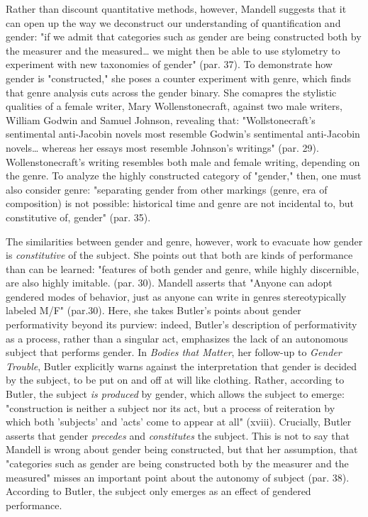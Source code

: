\documentclass[11pt]{article}
\begin{document}
Rather than discount quantitative methods, however, Mandell suggests
that it can open up the way we deconstruct our understanding of
quantification and gender: "if we admit that categories such as gender
are being constructed both by the measurer and the measured\ldots{} we
might then be able to use stylometry to experiment with new taxonomies
of gender" (par. 37). To demonstrate how gender is "constructed," she
poses a counter experiment with genre, which finds that genre analysis
cuts across the gender binary. She comapres the stylistic qualities of
a female writer, Mary Wollenstonecraft, against two male writers,
William Godwin and Samuel Johnson, revealing that: "Wollstonecraft’s
sentimental anti-Jacobin novels most resemble Godwin’s sentimental
anti-Jacobin novels\ldots{} whereas her essays most resemble Johnson’s
writings" (par. 29). Wollenstonecraft's writing resembles both male
and female writing, depending on the genre. To analyze the highly
constructed category of "gender," then, one must also consider genre:
"separating gender from other markings (genre, era of composition) is
not possible: historical time and genre are not incidental to, but
constitutive of, gender" (par. 35).

The similarities between gender and genre, however, work to evacuate
how gender is \emph{constitutive} of the subject. She points out that both
are kinds of performance than can be learned: "features of both gender
and genre, while highly discernible, are also highly
imitable. (par. 30). Mandell asserts that "Anyone can adopt gendered
modes of behavior, just as anyone can write in genres stereotypically
labeled M/F" (par.30). Here, she takes Butler's points about gender
performativity beyond its purview: indeed, Butler's description of
performativity as a process, rather than a singular act, emphasizes
the lack of an autonomous subject that performs gender. In \emph{Bodies
that Matter}, her follow-up to \emph{Gender Trouble}, Butler explicitly
warns against the interpretation that gender is decided by the
subject, to be put on and off at will like clothing. Rather, according
to Butler, the subject \emph{is produced} by gender, which allows the
subject to emerge: "construction is neither a subject nor its act, but
a process of reiteration by which both 'subjects' and 'acts' come to
appear at all" (xviii). Crucially, Butler asserts that gender
\emph{precedes} and \emph{constitutes} the subject. This is not to say that
Mandell is wrong about gender being constructed, but that her
assumption, that "categories such as gender are being constructed both
by the measurer and the measured" misses an important point about the
autonomy of subject (par. 38). According to Butler, the subject only
emerges as an effect of gendered performance.
\end{document}
